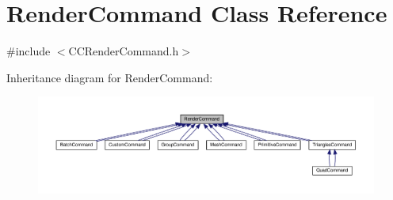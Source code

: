 \hypertarget{classRenderCommand}{}\section{Render\+Command Class Reference}
\label{classRenderCommand}


{\ttfamily \#include $<$C\+C\+Render\+Command.\+h$>$}



Inheritance diagram for Render\+Command\+:
\nopagebreak
\begin{figure}[H]
\begin{center}
\leavevmode
\includegraphics[width=350pt]{classRenderCommand__inherit__graph}
\end{center}
\end{figure}
